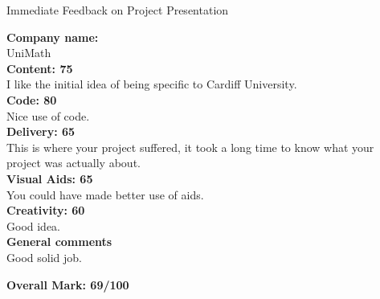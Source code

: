 \documentclass{article}
\begin{document}
\begin{center}
\Huge{Immediate Feedback on Project Presentation}\\
\end{center}


\normalsize
\textbf{Company name:}\\

UniMath \\

\textbf{Content: 75}\\

I like the initial idea of being specific to Cardiff University.\\

\textbf{Code: 80}\\

Nice use of code.\\

\textbf{Delivery: 65}\\

This is where your project suffered, it took a long time to know what your project was actually about.\\

\textbf{Visual Aids: 65}\\

You could have made better use of aids.\\

\textbf{Creativity: 60}\\

Good idea.\\

\textbf{General comments}\\

Good solid job.

\textbf{Overall Mark: 69/100}
\end{document}
